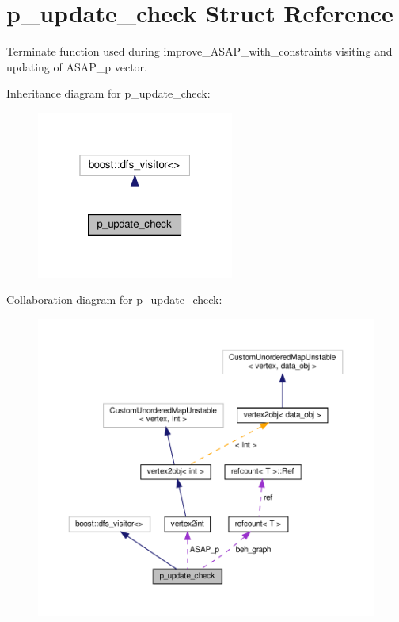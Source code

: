 \hypertarget{structp__update__check}{}\section{p\+\_\+update\+\_\+check Struct Reference}
\label{structp__update__check}


Terminate function used during improve\+\_\+\+A\+S\+A\+P\+\_\+with\+\_\+constraints visiting and updating of A\+S\+A\+P\+\_\+p vector.  




Inheritance diagram for p\+\_\+update\+\_\+check\+:
\nopagebreak
\begin{figure}[H]
\begin{center}
\leavevmode
\includegraphics[width=184pt]{d0/d35/structp__update__check__inherit__graph}
\end{center}
\end{figure}


Collaboration diagram for p\+\_\+update\+\_\+check\+:
\nopagebreak
\begin{figure}[H]
\begin{center}
\leavevmode
\includegraphics[width=350pt]{d6/df7/structp__update__check__coll__graph}
\end{center}
\end{figure}
